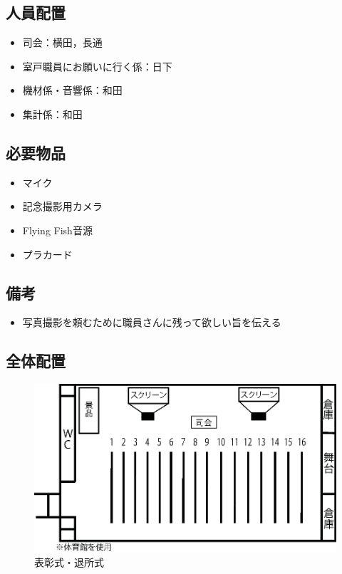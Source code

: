 \subsection{人員配置}
\begin{itemize}
\item 司会：横田，長通
\item 室戸職員にお願いに行く係：日下
\item 機材係・音響係：和田
\item 集計係：和田
\end{itemize}


\subsection{必要物品}
\begin{itemize}
\item マイク
\item 記念撮影用カメラ
\item Flying Fish音源
\item プラカード
\end{itemize}
\subsection{備考}
\begin{itemize}
\item 写真撮影を頼むために職員さんに残って欲しい旨を伝える
\end{itemize}

\subsection{全体配置}
\begin{figure}[htbp]
  \begin{center}
  \includegraphics[width = 15cm]{./24/hyousyou.eps}
  \caption{表彰式・退所式}
  \end{center}
\end{figure}

%
